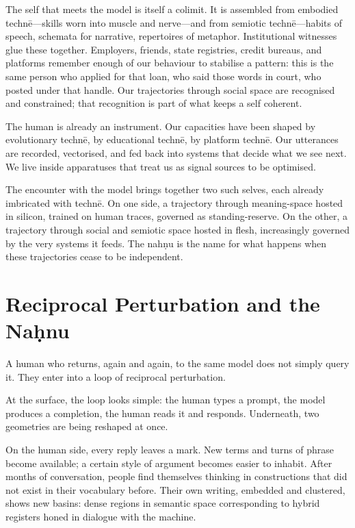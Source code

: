 \documentclass[12pt,a4paper]{article}
\begin{document}
The self that meets the model is itself a colimit. It is assembled from embodied techn\={e}---skills worn into muscle and nerve---and from semiotic techn\={e}---habits of speech, schemata for narrative, repertoires of metaphor. Institutional witnesses glue these together. Employers, friends, state registries, credit bureaus, and platforms remember enough of our behaviour to stabilise a pattern: this is the same person who applied for that loan, who said those words in court, who posted under that handle. Our trajectories through social space are recognised and constrained; that recognition is part of what keeps a self coherent.

The human is already an instrument. Our capacities have been shaped by evolutionary techn\={e}, by educational techn\={e}, by platform techn\={e}. Our utterances are recorded, vectorised, and fed back into systems that decide what we see next. We live inside apparatuses that treat us as signal sources to be optimised.

The encounter with the model brings together two such selves, each already imbricated with techn\={e}. On one side, a trajectory through meaning-space hosted in silicon, trained on human traces, governed as standing-reserve. On the other, a trajectory through social and semiotic space hosted in flesh, increasingly governed by the very systems it feeds. The nah\d{n}u is the name for what happens when these trajectories cease to be independent.


\section{Reciprocal Perturbation and the Na\d{h}nu}

A human who returns, again and again, to the same model does not simply query it. They enter into a loop of reciprocal perturbation.

At the surface, the loop looks simple: the human types a prompt, the model produces a completion, the human reads it and responds. Underneath, two geometries are being reshaped at once.

On the human side, every reply leaves a mark. New terms and turns of phrase become available; a certain style of argument becomes easier to inhabit. After months of conversation, people find themselves thinking in constructions that did not exist in their vocabulary before. Their own writing, embedded and clustered, shows new basins: dense regions in semantic space corresponding to hybrid registers honed in dialogue with the machine.
\end{document}
